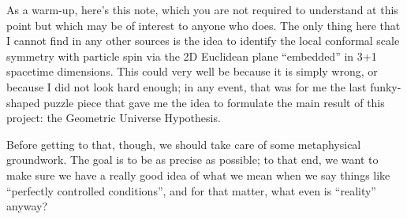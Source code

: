 As a warm-up, here's this note, which you are not required to understand at this point but which may be of interest to anyone who does. The only thing here that I cannot find in any other sources is the idea to identify the local conformal scale symmetry with particle spin via the 2D Euclidean plane ``embedded'' in 3+1 spacetime dimensions. This could very well be because it is simply wrong, or because I did not look hard enough; in any event, that was for me the last funky-shaped puzzle piece that gave me the idea to formulate the main result of this project: the Geometric Universe Hypothesis.

Before getting to that, though, we should take care of some metaphysical groundwork. The goal is to be as precise as possible; to that end, we want to make sure we have a really good idea of what we mean when we say things like ``perfectly controlled conditions'', and for that matter, what even is ``reality'' anyway?
